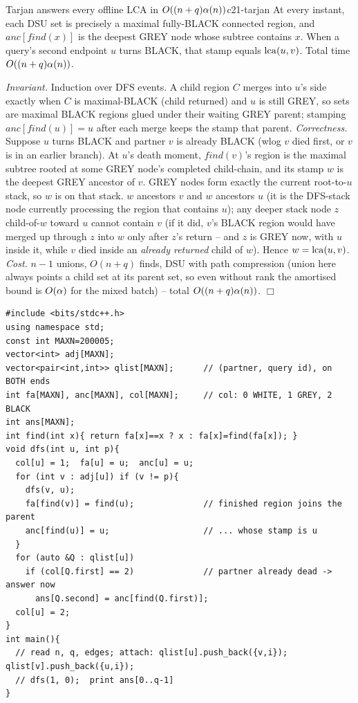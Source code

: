 \begin{theorem}{Tarjan answers every offline LCA in \(O((n+q)\alpha(n))\)}{c21-tarjan}
At every instant, each DSU set is precisely a maximal fully-BLACK connected
region, and \(\mathit{anc}[\mathit{find}(x)]\) is the deepest GREY node whose
subtree contains \(x\).  When a query's second endpoint \(u\) turns BLACK,
that stamp equals \(\operatorname{lca}(u,v)\).  Total time \(O((n+q)\alpha(n))\).
\end{theorem}
\begin{proofbox}
\emph{Invariant.} Induction over DFS events.  A child region \(C\) merges into
\(u\)'s side exactly when \(C\) is maximal-BLACK (child returned) and \(u\) is
still GREY, so sets are maximal BLACK regions glued under their waiting GREY
parent; stamping \(\mathit{anc}[\mathit{find}(u)]=u\) after each merge keeps the
stamp that parent. \emph{Correctness.} Suppose \(u\) turns BLACK and partner
\(v\) is already BLACK (wlog \(v\) died first, or \(v\) is in an earlier branch).
At \(u\)'s death moment, \(\mathit{find}(v)\)'s region is the maximal subtree
rooted at some GREY node's completed child-chain, and its stamp \(w\) is the
deepest GREY ancestor of \(v\).  GREY nodes form exactly the current root-to-\(u\)
stack, so \(w\) is on that stack.  \(w\) ancestors \(v\) and \(w\) ancestors
\(u\) (it is the DFS-stack node currently processing the region that contains
\(u\)); any deeper stack node \(z\) child-of-\(w\) toward \(u\) cannot contain
\(v\) (if it did, \(v\)'s BLACK region would have merged up through \(z\) into
\(w\) only after \(z\)'s return -- and \(z\) is GREY now, with \(u\) inside it,
while \(v\) died inside an \emph{already returned} child of \(w\)).  Hence
\(w=\operatorname{lca}(u,v)\). \emph{Cost.} \(n-1\) unions, \(O(n+q)\) finds, DSU with path
compression (union here always points a child set at its parent set, so even
without rank the amortised bound is \(O(\alpha)\) for the mixed batch) --
total \(O((n+q)\alpha(n))\). \(\Box\)
\end{proofbox}

\begin{lstlisting}[caption={Tarjan offline LCA in full: two-endpoint query attachment, union-on-child-return, answer on second endpoint's death. ASCII only}, label={lst:c21-tarjan}]
#include <bits/stdc++.h>
using namespace std;
const int MAXN=200005;
vector<int> adj[MAXN];
vector<pair<int,int>> qlist[MAXN];      // (partner, query id), on BOTH ends
int fa[MAXN], anc[MAXN], col[MAXN];     // col: 0 WHITE, 1 GREY, 2 BLACK
int ans[MAXN];
int find(int x){ return fa[x]==x ? x : fa[x]=find(fa[x]); }
void dfs(int u, int p){
  col[u] = 1;  fa[u] = u;  anc[u] = u;
  for (int v : adj[u]) if (v != p){
    dfs(v, u);
    fa[find(v)] = find(u);              // finished region joins the parent
    anc[find(u)] = u;                   // ... whose stamp is u
  }
  for (auto &Q : qlist[u])
    if (col[Q.first] == 2)              // partner already dead -> answer now
      ans[Q.second] = anc[find(Q.first)];
  col[u] = 2;
}
int main(){
  // read n, q, edges; attach: qlist[u].push_back({v,i}); qlist[v].push_back({u,i});
  // dfs(1, 0);  print ans[0..q-1]
}
\end{lstlisting}


